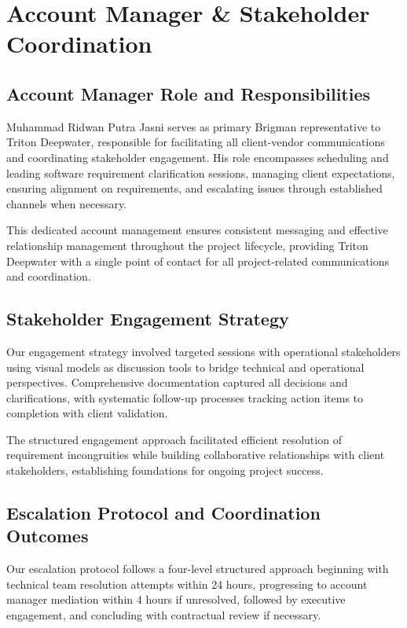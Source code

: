 \documentclass[12pt,a4paper]{article}
\begin{document}
\section{Account Manager \& Stakeholder Coordination}
\label{sec:account}

\subsection{Account Manager Role and Responsibilities}

Muhammad Ridwan Putra Jasni serves as primary Brigman representative to Triton Deepwater, responsible for facilitating all client-vendor communications and coordinating stakeholder engagement. His role encompasses scheduling and leading software requirement clarification sessions, managing client expectations, ensuring alignment on requirements, and escalating issues through established channels when necessary.

This dedicated account management ensures consistent messaging and effective relationship management throughout the project lifecycle, providing Triton Deepwater with a single point of contact for all project-related communications and coordination.

\subsection{Stakeholder Engagement Strategy}

Our engagement strategy involved targeted sessions with operational stakeholders using visual models as discussion tools to bridge technical and operational perspectives. Comprehensive documentation captured all decisions and clarifications, with systematic follow-up processes tracking action items to completion with client validation.

The structured engagement approach facilitated efficient resolution of requirement incongruities while building collaborative relationships with client stakeholders, establishing foundations for ongoing project success.

\subsection{Escalation Protocol and Coordination Outcomes}

Our escalation protocol follows a four-level structured approach beginning with technical team resolution attempts within 24 hours, progressing to account manager mediation within 4 hours if unresolved, followed by executive engagement, and concluding with contractual review if necessary.
\end{document}
